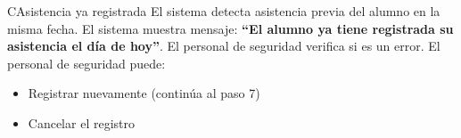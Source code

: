 \begin{UCtrayectoriaA}{C}{Asistencia ya registrada}
	\UCpaso El sistema detecta asistencia previa del alumno en la misma fecha.
	\UCpaso El sistema muestra mensaje: {\bf ``El alumno ya tiene registrada su asistencia el día de hoy''}.
	\UCpaso[\UCactor] El personal de seguridad verifica si es un error.
	\UCpaso[\UCactor] El personal de seguridad puede:
	\begin{itemize}
		\item Registrar nuevamente (continúa al paso 7)
		\item Cancelar el registro
	\end{itemize}
\end{UCtrayectoriaA}

